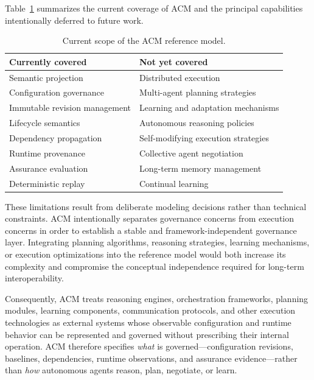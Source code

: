 \documentclass[10pt]{article}
\begin{document}
Table~\ref{tab:limitations_scope} summarizes the current coverage of ACM and the principal capabilities intentionally deferred to future work.

\begin{table}[t]
	\caption{Current scope of the ACM reference model.}
	\label{tab:limitations_scope}
	\centering
	\begin{tabular}{p{3.1cm}p{3.4cm}}
		\hline
		\textbf{Currently covered} &
		\textbf{Not yet covered} \\
		\hline
		Semantic projection &
		Distributed execution \\
		Configuration governance &
		Multi-agent planning strategies \\
		Immutable revision management &
		Learning and adaptation mechanisms \\
		Lifecycle semantics &
		Autonomous reasoning policies \\
		Dependency propagation &
		Self-modifying execution strategies \\
		Runtime provenance &
		Collective agent negotiation \\
		Assurance evaluation &
		Long-term memory management \\
		Deterministic replay &
		Continual learning \\
		\hline
	\end{tabular}
\end{table}

These limitations result from deliberate modeling decisions rather than technical constraints. ACM intentionally separates governance concerns from execution concerns in order to establish a stable and framework-independent governance layer. Integrating planning algorithms, reasoning strategies, learning mechanisms, or execution optimizations into the reference model would both increase its complexity and compromise the conceptual independence required for long-term interoperability.

Consequently, ACM treats reasoning engines, orchestration frameworks, planning modules, learning components, communication protocols, and other execution technologies as external systems whose observable configuration and runtime behavior can be represented and governed without prescribing their internal operation. ACM therefore specifies \emph{what} is governed---configuration revisions, baselines, dependencies, runtime observations, and assurance evidence---rather than \emph{how} autonomous agents reason, plan, negotiate, or learn.
\end{document}
